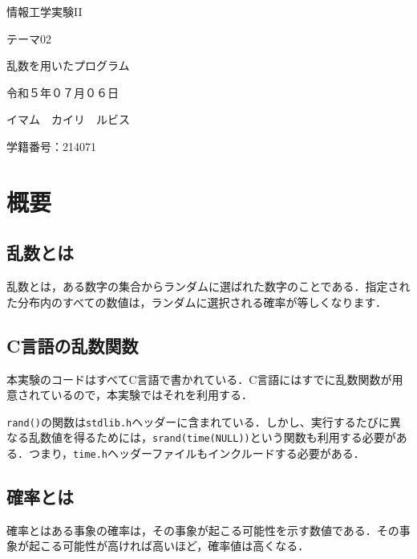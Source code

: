 \documentclass[a4j, titlepage]{jarticle}
\begin{document}
  \begin{center}
  \huge 情報工学実験II\par
  \vspace{15mm}
  \huge テーマ02 \par
  \huge 乱数を用いたプログラム \par
  \vspace{15mm}
  \vspace{20mm}
  \vspace{100mm}
  \Large 令和５年０７月０６日 \par
  \vspace{15mm}
  \Large イマム　カイリ　ルビス \par
  \vspace{10mm}
  \Large 学籍番号：214071\par
  \vspace{10mm}
\end{center}
\clearpage

\tableofcontents
\clearpage

\section{概要}
  \subsection{乱数とは}
    乱数とは，ある数字の集合からランダムに選ばれた数字のことである．指定された分布内のすべての数値は，ランダムに選択される確率が等しくなります．

  \subsection{C言語の乱数関数}
    本実験のコードはすべてC言語で書かれている．C言語にはすでに乱数関数が用意されているので，本実験ではそれを利用する．

    \texttt{rand()}の関数は\texttt{stdlib.h}ヘッダーに含まれている．しかし、実行するたびに異なる乱数値を得るためには，\texttt{srand(time(NULL))}という関数も利用する必要がある．つまり，\texttt{time.h}ヘッダーファイルもインクルードする必要がある．

  \subsection{確率とは}
  確率とはある事象の確率は，その事象が起こる可能性を示す数値である．その事象が起こる可能性が高ければ高いほど，確率値は高くなる．\cite{wiki}
  
\end{document}
